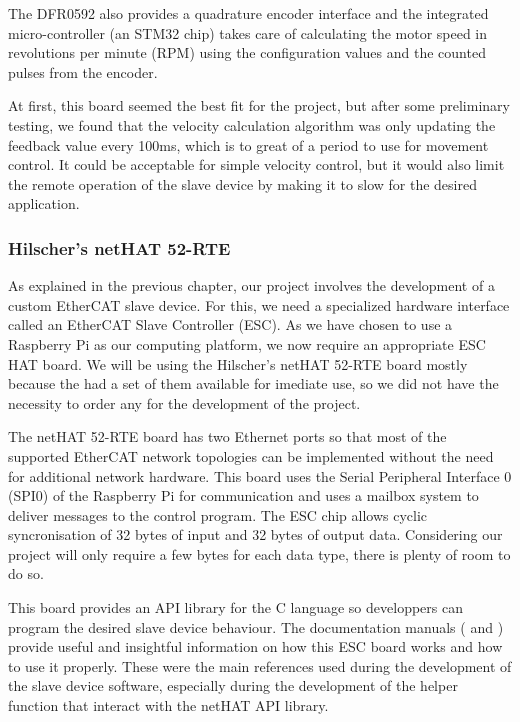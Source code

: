 The DFR0592 also provides a quadrature encoder interface and the integrated micro-controller (an STM32 chip) takes care of calculating the motor speed in revolutions per minute (RPM) using the configuration values and the counted pulses from the encoder.

At first, this board seemed the best fit for the project, but after some preliminary testing, we found that the velocity calculation algorithm was only updating the feedback value every 100ms, which is to great of a period to use for movement control.
It could be acceptable for simple velocity control, but it would also limit the remote operation of the slave device by making it to slow for the desired application.

\subsubsection{Hilscher's netHAT 52-RTE}
As explained in the previous chapter, our project involves the development of a custom EtherCAT slave device.
For this, we need a specialized hardware interface called an EtherCAT Slave Controller (ESC).
As we have chosen to use a Raspberry Pi as our computing platform, we now require an appropriate ESC HAT board.
We will be using the Hilscher's netHAT 52-RTE \cite{hdw:nethat-52rte} board mostly because the \Feup{} had a set of them available for imediate use, so we did not have the necessity to order any for the development of the project.

The netHAT 52-RTE board has two Ethernet ports so that most of the supported EtherCAT network topologies can be implemented without the need for additional network hardware.
This board uses the Serial Peripheral Interface 0 (SPI0) of the Raspberry Pi for communication and uses a mailbox system to deliver messages to the control program.
The ESC chip allows cyclic syncronisation of 32 bytes of input and 32 bytes of output data.
Considering our project will only require a few bytes for each data type, there is plenty of room to do so.

This board provides an API library for the C language so developpers can program the desired slave device behaviour.
The documentation manuals (\cite{nethat:cifx_api_docs} and \cite{nethat:ethercat_api_docs}) provide useful and insightful information on how this ESC board works and how to use it properly.
These were the main references used during the development of the slave device software, especially during the development of the helper function that interact with the netHAT API library.

